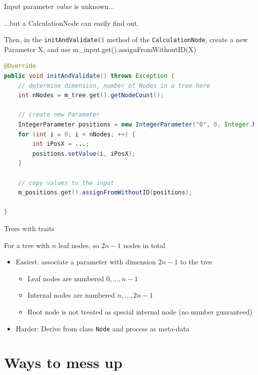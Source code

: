 \documentclass{beamer}
\theoremstyle{definition}
\begin{document}
\begin{frame}[containsverbatim]{Input parameter {\em value} is unknown...}

...but a CalculationNode can easily find out.\vskip 0.5cm

Then, in the {\tt initAndValidate()} method of the {\tt CalculationNode},
create a new Parameter X, and use m_input.get().assignFromWithoutID(X)

\begin{lstlisting}[language=java]
@Override
public void initAndValidate() throws Exception {
    // determine dimension, number of Nodes in a tree here
	int nNodes = m_tree.get().getNodeCount();

    // create new Parameter
	IntegerParameter positions = new IntegerParameter("0", 0, Integer.MAX_VALUE, nNodes);
	for (int i = 0; i < nNodes; ++) {
		int iPosX = ...;
		positions.setValue(i, iPosX);
	}

    // copy values to the input
	m_positions.get().assignFromWithoutID(positions);
	
}
\end{lstlisting}

\end{frame}

\begin{frame}[containsverbatim]{Trees with traits}

For a tree with $n$ leaf nodes, so $2n-1$ nodes in total
\begin{itemize}
\item Easiest: associate a parameter with dimension $2n-1$ to the tree
\begin{itemize}
\item Leaf nodes are numbered $0,\ldots,n-1$
\item Internal nodes are numbered $n,\ldots,2n-1$
\item Root node is not treated as special internal node (no number guaranteed)
\end{itemize}
\item Harder: Derive from class {\tt Node} and process as meta-data
\end{itemize}

\end{frame}


\section{Ways to mess up}
\end{document}
